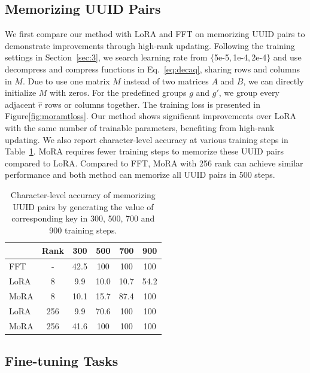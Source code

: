 \documentclass[11pt]{article}
\begin{document}
\subsection{Memorizing UUID Pairs}
\label{sec:memorizing}
We first compare our method with LoRA and FFT on memorizing UUID pairs to demonstrate improvements through high-rank updating.
Following the training settings in Section~\ref{sec:3}, we search learning rate from $\{$5e-5$,$1e-4$,$2e-4$\}$ and use decompress and compress functions in Eq.~\ref{eq:decaq}, sharing rows and columns in $M$.
Due to use one matrix $M$ instead of two matrices $A$ and $B$, we can directly initialize $M$ with zeros.
For the predefined groups $g$ and $g'$, we group every adjacent $\hat{r}$ rows or columns together.
The training loss is presented in Figure\ref{fig:moramtloss}. Our method shows significant improvements over LoRA with the same number of trainable parameters, benefiting from high-rank updating. We also report character-level accuracy at various training steps in Table~\ref{your-table-label}. MoRA requires fewer training steps to memorize these UUID pairs compared to LoRA.
Compared to FFT, MoRA with 256 rank can achieve similar performance and both method can memorize all UUID pairs in 500 steps.

\begin{table}[t]
  \small
\centering
\begin{tabular}{lccccc}
\toprule
& Rank & {300} & {500} & {700} & {900} \\ \midrule
FFT & - & 42.5 & \cellcolor{lightcyan} 100 & \cellcolor{lightcyan} 100 & \cellcolor{lightcyan} 100 \\
LoRA & 8  & 9.9 & 10.0 & 10.7 & 54.2 \\
MoRA & 8   & 10.1 & 15.7 & 87.4 & \cellcolor{lightcyan}100 \\
LoRA & 256 & 9.9 & 70.6 & \cellcolor{lightcyan}100 & \cellcolor{lightcyan}100 \\
MoRA & 256 & 41.6 & \cellcolor{lightcyan}100 & \cellcolor{lightcyan}100 & \cellcolor{lightcyan}100 \\
\bottomrule
\end{tabular}
\caption{Character-level accuracy of memorizing UUID pairs by generating the value of corresponding key in 300, 500, 700 and 900 training steps.}
\label{your-table-label}
\vspace{-10pt}
\end{table}


\subsection{Fine-tuning Tasks}
\label{sec:finetuning}
\end{document}
